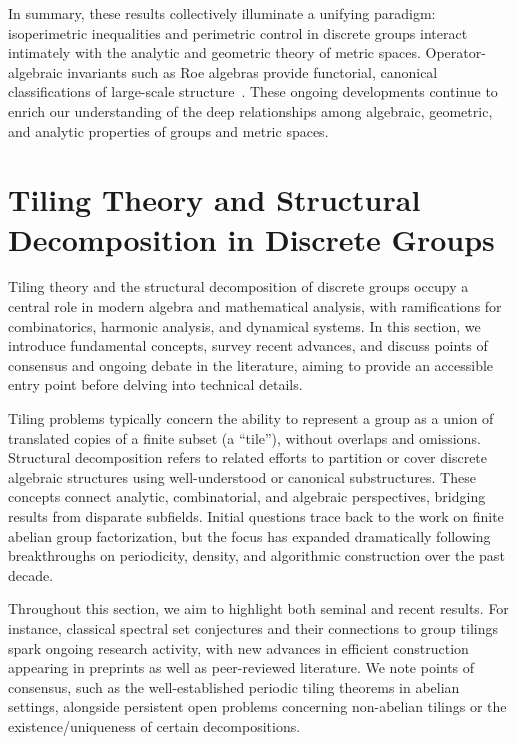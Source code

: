 \documentclass[sigconf]{acmart}
\begin{document}
In summary, these results collectively illuminate a unifying paradigm: isoperimetric inequalities and perimetric control in discrete groups interact intimately with the analytic and geometric theory of metric spaces. Operator-algebraic invariants such as Roe algebras provide functorial, canonical classifications of large-scale structure~\cite{ref51,ref52,ref108}. These ongoing developments continue to enrich our understanding of the deep relationships among algebraic, geometric, and analytic properties of groups and metric spaces.

\section{Tiling Theory and Structural Decomposition in Discrete Groups}

Tiling theory and the structural decomposition of discrete groups occupy a central role in modern algebra and mathematical analysis, with ramifications for combinatorics, harmonic analysis, and dynamical systems. In this section, we introduce fundamental concepts, survey recent advances, and discuss points of consensus and ongoing debate in the literature, aiming to provide an accessible entry point before delving into technical details.

Tiling problems typically concern the ability to represent a group as a union of translated copies of a finite subset (a ``tile''), without overlaps and omissions. Structural decomposition refers to related efforts to partition or cover discrete algebraic structures using well-understood or canonical substructures. These concepts connect analytic, combinatorial, and algebraic perspectives, bridging results from disparate subfields. Initial questions trace back to the work on finite abelian group factorization, but the focus has expanded dramatically following breakthroughs on periodicity, density, and algorithmic construction over the past decade.

Throughout this section, we aim to highlight both seminal and recent results. For instance, classical spectral set conjectures and their connections to group tilings spark ongoing research activity, with new advances in efficient construction appearing in preprints as well as peer-reviewed literature. We note points of consensus, such as the well-established periodic tiling theorems in abelian settings, alongside persistent open problems concerning non-abelian tilings or the existence/uniqueness of certain decompositions.
\end{document}
